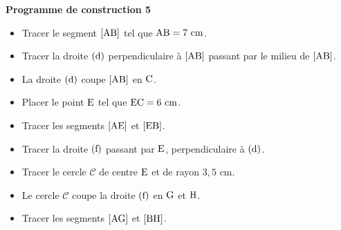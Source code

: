 \documentclass[exercice,a4]{thedocument}%
\begin{document}
%
\noindent\textbf{Programme de construction 5}\par\smallskip\noindent
\begin{itemize}
    \item Tracer le segment $[\text{AB}]$ tel que
    $\text{AB}=7\text{ cm}$.
    \item Tracer la droite $(\text{d})$ perpendiculaire à
    $[\text{AB}]$ passant par le milieu de $[\text{AB}]$.
    \item La droite $(\text{d})$ coupe $[\text{AB}]$ en
    $\text{C}$.
    \item Placer le point $\text{E}$ tel que $\text{EC}=6\text{ cm}$.
    \item Tracer les segments $[\text{AE}]$ et $[\text{EB}]$.
    \item Tracer la droite $(\text{f})$ passant par $\text{E}$,
    perpendiculaire à $(\text{d})$.
    \item Tracer le cercle $\mathcal{C}$ de centre $\text{E}$ et de
    rayon $3{,}5\text{ cm}$.
    \item Le cercle $\mathcal{C}$ coupe la droite $(\text{f})$ en
    $\text{G}$ et $\text{H}$.
    \item Tracer les segments $[\text{AG}]$ et $[\text{BH}]$.
\end{itemize}
\end{document}
